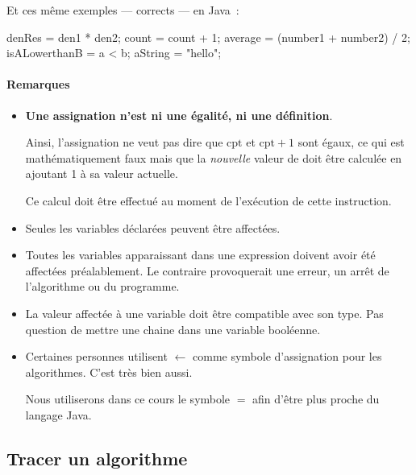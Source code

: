 				Et ces même exemples — corrects — en Java~:

				\begin{java}
denRes = den1 * den2;
count = count + 1;
average = (number1 + number2) / 2;
isALowerthanB = a < b;
aString = "hello";
				\end{java}
				
			\paragraph{Remarques}
			
				\begin{itemize}
				\item 
					\textbf{Une assignation n’est ni une égalité, 
					ni une définition}.
					
					Ainsi, l’assignation  ne veut pas dire
					que $\textrm{cpt}$ et $\textrm{cpt} + 1$ sont égaux, ce qui
					est mathématiquement faux mais que la \emph{nouvelle} valeur
					de  doit être calculée en ajoutant 1 à sa valeur
					actuelle.  
					
					Ce calcul doit être effectué au moment de l'exécution
					de cette instruction. 
				
				\item 
					Seules les variables déclarées peuvent être affectées.
				\item 
					Toutes les variables apparaissant dans une expression
					doivent avoir été affectées préalablement. 
					Le contraire provoquerait une erreur,
					un arrêt de l’algorithme ou du programme.
				\item 
					La valeur affectée à une variable 
					doit être compatible avec son type.
					Pas question de mettre une chaine dans une variable
					booléenne.
				\item 
					Certaines personnes utilisent \textbf{$\leftarrow$} comme 
					symbole d'assignation pour les algorithmes. C'est très bien 
					aussi. 

					Nous utiliserons dans ce cours le symbole $=$ afin d'être plus
					proche du langage Java. 
				\end{itemize}
				
				\subsection{Tracer un algorithme}\label{tracer}
		
